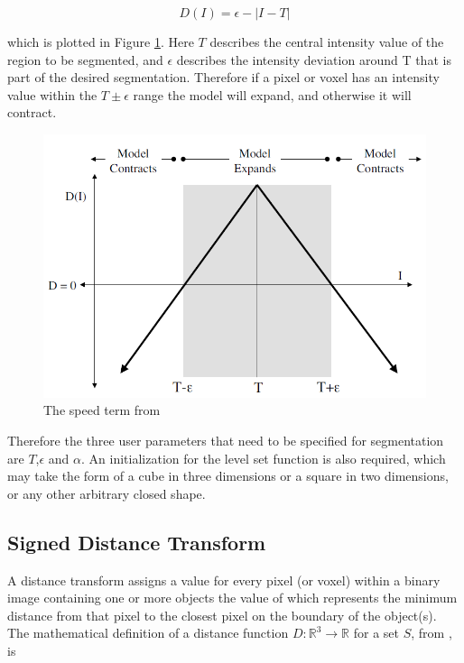 	\begin{equation}
	D(I)= \epsilon - |I-T|
	\end{equation}

which is plotted in Figure \ref{fig:speedterm}. Here $T$ describes the central intensity value of the region to be segmented, and $\epsilon$ describes the intensity deviation around T that is part of the desired segmentation. Therefore if a pixel or voxel has an intensity value within the $T\pm\epsilon$ range the model will expand, and otherwise it will contract. 

	\begin{figure}[h]
		\centering
			\includegraphics[scale=0.3]{images/speedterm.png}
		\caption{The speed term from \cite{gist}}
		\label{fig:speedterm}
	\end{figure}

Therefore the three user parameters that need to be specified for segmentation are $T$,$\epsilon$ and $\alpha$. An initialization for the level set function is also required, which may take the form of a cube in three dimensions or a square in two dimensions, or any other arbitrary closed shape. 


	\subsection{Signed Distance Transform}
A distance transform assigns a value for every pixel (or voxel) within a binary image containing one or more objects the value of which represents the minimum distance from that pixel to the closest pixel on the boundary of the object(s). The mathematical definition of a distance function $D:\mathbb{R}^3 \rightarrow \mathbb{R}$ for a set $S$, from \cite{oshersethian}, is
	

